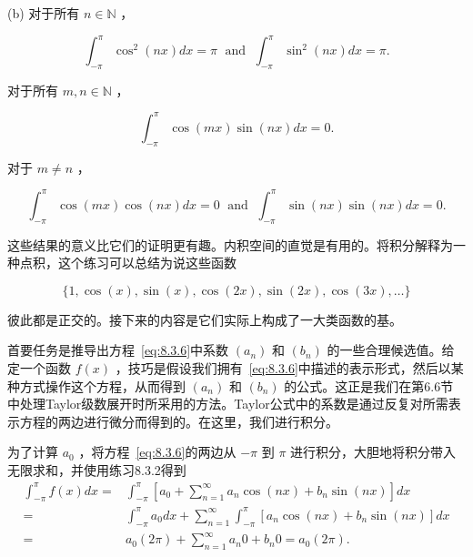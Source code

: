 (b) 对于所有 \(n \in  \mathbb{N}\) ，

\[
{\int }_{-\pi }^{\pi }{\cos }^{2}\left( {nx}\right) {dx} = \pi \;\text{ and }\;{\int }_{-\pi }^{\pi }{\sin }^{2}\left( {nx}\right) {dx} = \pi .
\]

对于所有 \(m,n \in  \mathbb{N}\) ，

\[
{\int }_{-\pi }^{\pi }\cos \left( {mx}\right) \sin \left( {nx}\right) {dx} = 0.
\]

对于 \(m \neq  n\) ，

\[
{\int }_{-\pi }^{\pi }\cos \left( {mx}\right) \cos \left( {nx}\right) {dx} = 0\;\text{ and }\;{\int }_{-\pi }^{\pi }\sin \left( {nx}\right) \sin \left( {nx}\right) {dx} = 0.
\]

这些结果的意义比它们的证明更有趣。内积空间的直觉是有用的。将积分解释为一种点积，这个练习可以总结为说这些函数

\[
\{ 1,\cos \left( x\right) ,\sin \left( x\right) ,\cos \left( {2x}\right) ,\sin \left( {2x}\right) ,\cos \left( {3x}\right) ,\ldots \}
\]

彼此都是正交的。接下来的内容是它们实际上构成了一大类函数的基。

首要任务是推导出方程~\eqref{eq:8.3.6}中系数 \(\left( {a}_{n}\right)\) 和 \(\left( {b}_{n}\right)\) 的一些合理候选值。给定一个函数 \(f\left( x\right)\) ，技巧是假设我们拥有~\eqref{eq:8.3.6}中描述的表示形式，然后以某种方式操作这个方程，从而得到 \(\left( {a}_{n}\right)\) 和 \(\left( {b}_{n}\right)\) 的公式。这正是我们在第6.6节中处理Taylor级数展开时所采用的方法。Taylor公式中的系数是通过反复对所需表示方程的两边进行微分而得到的。在这里，我们进行积分。

为了计算 \({a}_{0}\) ，将方程~\eqref{eq:8.3.6}的两边从 \(- \pi\) 到 \(\pi\) 进行积分，大胆地将积分带入无限求和，并使用练习8.3.2得到
\begin{align*}
{\int }_{-\pi }^{\pi }f\left( x\right) {dx} = &{\int }_{-\pi }^{\pi }\left\lbrack  {{a}_{0} + \mathop{\sum }\limits_{{n = 1}}^{\infty }{a}_{n}\cos \left( {nx}\right)  + {b}_{n}\sin \left( {nx}\right) }\right\rbrack  {dx}\\
=& {\int }_{-\pi }^{\pi }{a}_{0}{dx} + \mathop{\sum }\limits_{{n = 1}}^{\infty }{\int }_{-\pi }^{\pi }\left\lbrack  {{a}_{n}\cos \left( {nx}\right)  + {b}_{n}\sin \left( {nx}\right) }\right\rbrack  {dx}\\
=& {a}_{0}\left( {2\pi }\right)  + \mathop{\sum }\limits_{{n = 1}}^{\infty }{a}_{n}0 + {b}_{n}0 = {a}_{0}\left( {2\pi }\right) .
\end{align*}

